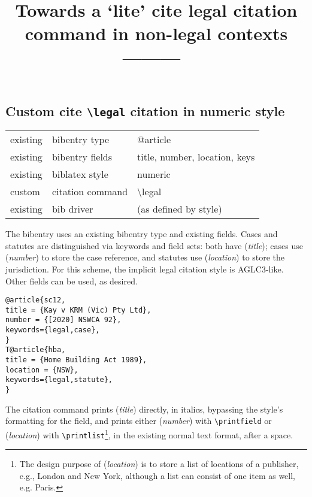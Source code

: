 \documentclass[12pt]{article}
\title{Towards a `lite' cite legal citation command in non-legal contexts\\[24pt]\normalsize \hfill ---------\hfill\ }
\author{}
\date{}
\newcommand\notsogoodoh{{\large\ftmark 🗶}}
\newcommand\bef[1]{(\textit{#1})}
\newcommand\cmd[1]{\texttt{\textbackslash #1}}
\begin{document}
\maketitle
\tableofcontents








\subsection{Custom cite \cmd{legal} citation in numeric style}
\begin{tabular}{lll}
existing   &    bibentry type               & \ttfamily @article \\
existing   &    bibentry fields              & \ttfamily title, number, location, keys \\
existing   &    biblatex style                & \ttfamily numeric \\
custom    &    citation command           & \ttfamily \textbackslash legal \\
existing   &    bib driver                    & (as defined by style) \\
\end{tabular}
\bigskip

The bibentry uses an existing bibentry type and existing fields. Cases and statutes are distinguished via keywords and field sets: both have \bef{title}; cases use \bef{number} to store the case reference, and statutes use \bef{location} to store the jurisdiction. For this scheme, the implicit legal citation style is AGLC3-like. Other fields can be used, as desired.

\begin{verbatim}
@article{sc12,
title = {Kay v KRM (Vic) Pty Ltd},
number = {[2020] NSWCA 92},
keywords={legal,case},
}
T@article{hba,
title = {Home Building Act 1989},
location = {NSW},
keywords={legal,statute},
}
\end{verbatim}

The citation command prints \bef{title} directly, in italics, bypassing the style's formatting for the field, and prints either \bef{number} with \cmd{printfield} or \bef{location} with \cmd{printlist}\footnote{The design purpose of \bef{location} is to store a list of locations of a publisher, e.g., London and New York, although a list can consist of one item as well, e.g. Paris.}, in the existing normal text format, after a space.
\end{document}
